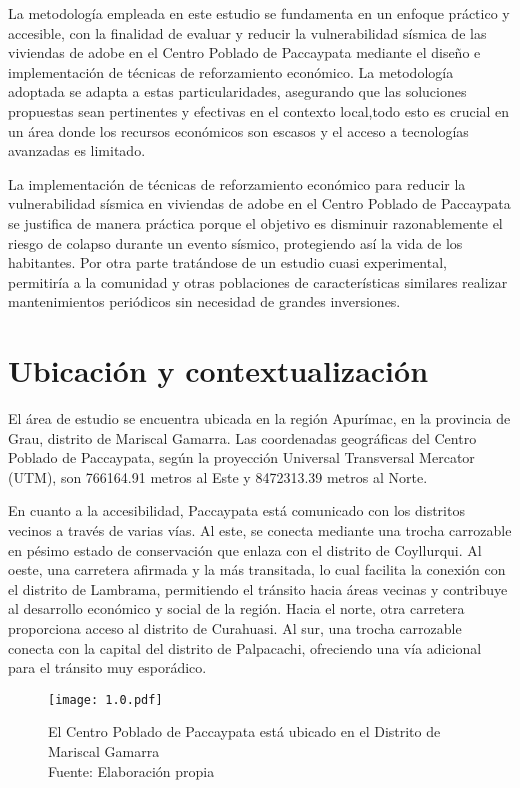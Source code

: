 
La metodología empleada en este estudio se fundamenta en un enfoque práctico y accesible, con la finalidad de evaluar y reducir la vulnerabilidad sísmica de las viviendas de adobe en el Centro Poblado de Paccaypata mediante el diseño e implementación de técnicas de reforzamiento económico. La metodología adoptada se adapta a estas particularidades, asegurando que las soluciones propuestas sean pertinentes y efectivas en el contexto local,todo esto es crucial en un área donde los recursos económicos son escasos y el acceso a tecnologías avanzadas es limitado.


La implementación de técnicas de reforzamiento económico para reducir la vulnerabilidad sísmica en viviendas de adobe en el Centro Poblado de Paccaypata se justifica de manera práctica porque el objetivo es disminuir razonablemente el riesgo de colapso durante un evento sísmico, protegiendo así la vida de los habitantes. Por otra parte tratándose de un estudio cuasi experimental, permitiría a la comunidad y otras poblaciones de características similares realizar mantenimientos periódicos sin necesidad de grandes inversiones.

\section{Ubicación y contextualización}

El área de estudio se encuentra ubicada en la región Apurímac, en la provincia de Grau,  distrito de Mariscal Gamarra. Las coordenadas geográficas del Centro Poblado de Paccaypata, según la proyección Universal Transversal Mercator (UTM), son 766164.91 metros al Este y 8472313.39 metros al Norte.

En cuanto a la accesibilidad, Paccaypata está comunicado con los distritos vecinos a través de varias vías. Al este, se conecta mediante una trocha carrozable en pésimo estado de conservación que enlaza con el distrito de Coyllurqui. Al oeste, una carretera afirmada y la más transitada, lo cual facilita la conexión con el distrito de Lambrama, permitiendo el tránsito hacia áreas vecinas y contribuye al desarrollo económico y social de la región. Hacia el norte, otra carretera proporciona acceso al distrito de Curahuasi. Al sur, una trocha carrozable conecta con la capital del distrito de Palpacachi, ofreciendo una vía adicional para el tránsito muy esporádico.
\vspace{5mm}

\begin{figure}[h!]
\captionsetup{width=\textwidth}
\centering
\texttt{[image: 1.0.pdf]}
\caption[Ubicación del Centro Poblado de Paccaypata]{El Centro Poblado de Paccaypata está ubicado en el Distrito de Mariscal Gamarra\\ Fuente: Elaboración propia}
\label{fig:1}
\end{figure}
